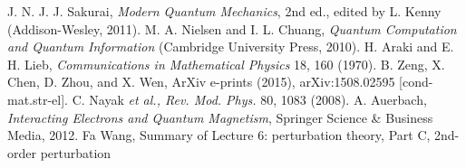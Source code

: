 \begin{thebibliography}{99}
J. N. J. J. Sakurai, \textsl{Modern Quantum Mechanics}, 2nd ed., edited by L. Kenny (Addison-Wesley, 2011).
M. A. Nielsen and I. L. Chuang, \textsl{Quantum Computation and Quantum Information} (Cambridge University Press, 2010).
H. Araki and E. H. Lieb, \textsl{Communications in Mathematical Physics} 18, 160 (1970).
B. Zeng, X. Chen, D. Zhou, and X. Wen, ArXiv e-prints (2015), arXiv:1508.02595 [cond-mat.str-el].
C. Nayak \textsl{et al., Rev. Mod. Phys.} 80, 1083 (2008).
A. Auerbach, \textsl{Interacting Electrons and Quantum Magnetism}, Springer Science \& Business Media, 2012.
Fa Wang, Summary of Lecture 6: perturbation theory,  Part C, 2nd-order perturbation
\end{thebibliography}
